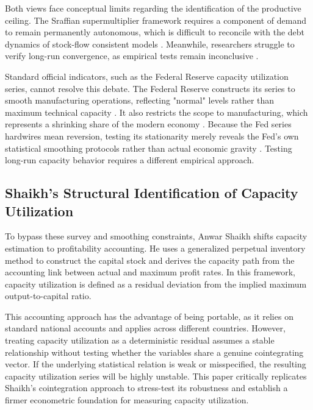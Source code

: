 \documentclass[11pt]{article}
\begin{document}
Both views face conceptual limits regarding the identification of the productive ceiling. The Sraffian supermultiplier framework requires a component of demand to remain permanently autonomous, which is difficult to reconcile with the debt dynamics of stock-flow consistent models \citep{Nikiforos2018}. Meanwhile, researchers struggle to verify long-run convergence, as empirical tests remain inconclusive \citep{GahnGonzalez2022}.

Standard official indicators, such as the Federal Reserve capacity utilization series, cannot resolve this debate. The Federal Reserve constructs its series to smooth manufacturing operations, reflecting "normal" levels rather than maximum technical capacity \citep{Shapiro1989}. It also restricts the scope to manufacturing, which represents a shrinking share of the modern economy \citep{Haluska2023}. Because the Fed series hardwires mean reversion, testing its stationarity merely reveals the Fed's own statistical smoothing protocols rather than actual economic gravity \citep{Nikiforos2016, Nikiforos2021}. Testing long-run capacity behavior requires a different empirical approach.

\subsection{Shaikh's Structural Identification of Capacity Utilization}
\label{subsec:shaikh_structural_measurement}

To bypass these survey and smoothing constraints, Anwar Shaikh \citep{Shaikh2016} shifts capacity estimation to profitability accounting. He uses a generalized perpetual inventory method to construct the capital stock and derives the capacity path from the accounting link between actual and maximum profit rates. In this framework, capacity utilization is defined as a residual deviation from the implied maximum output-to-capital ratio.

This accounting approach has the advantage of being portable, as it relies on standard national accounts and applies across different countries. However, treating capacity utilization as a deterministic residual assumes a stable relationship without testing whether the variables share a genuine cointegrating vector. If the underlying statistical relation is weak or misspecified, the resulting capacity utilization series will be highly unstable. This paper critically replicates Shaikh's cointegration approach to stress-test its robustness and establish a firmer econometric foundation for measuring capacity utilization.
\end{document}
